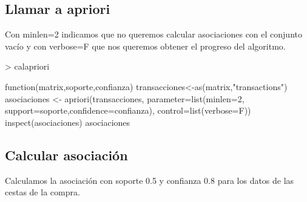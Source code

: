 \documentclass [a4paper] {article}
\begin{document}
\subsection{Llamar a apriori}
Con minlen=2 indicamos que no queremos calcular asociaciones con el conjunto vacío y con verbose=F que nos queremos obtener el progreso del algoritmo.
\begin{Schunk}
\begin{Sinput}
> calapriori
\end{Sinput}
\begin{Soutput}
function(matrix,soporte,confianza){
    transacciones<-as(matrix,"transactions")
    asociaciones <- apriori(transacciones, 
        parameter=list(minlen=2, support=soporte,confidence=confianza), 
        control=list(verbose=F))
    inspect(asociaciones)
    asociaciones
}
\end{Soutput}
\end{Schunk}

\newpage
\subsection{Calcular asociación}
Calculamos la asociación con soporte 0.5 y confianza 0.8 para los datos de las cestas de la compra.
\end{document}
